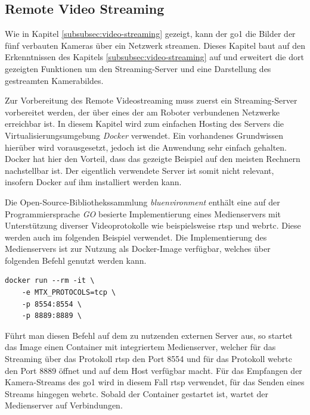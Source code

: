 \subsection{Remote Video Streaming}
\label{subsec:remote-video-streaming}

Wie in Kapitel \ref{subsubsec:video-streaming} gezeigt, kann der \gls{go1} die Bilder der fünf verbauten Kameras über
ein Netzwerk streamen.
Dieses Kapitel baut auf den Erkenntnissen des Kapitels \ref{subsubsec:video-streaming} auf und erweitert die dort gezeigten
Funktionen um den Streaming-Server und eine Darstellung des gestreamten Kamerabildes.


Zur Vorbereitung des Remote Videostreaming muss zuerst ein Streaming-Server vorbereitet werden, der über eines der am
Roboter verbundenen Netzwerke erreichbar ist.
In diesem Kapitel wird zum einfachen Hosting des Servers die Virtualisierungsumgebung \emph{Docker} verwendet.
Ein vorhandenes Grundwissen hierüber wird vorausgesetzt, jedoch ist die Anwendung sehr einfach gehalten.
Docker hat hier den Vorteil, dass das gezeigte Beispiel auf den meisten Rechnern nachstellbar ist.
Der eigentlich verwendete Server ist somit nicht relevant, insofern Docker auf ihm installiert werden kann.

Die Open-Source-Bibliothekssammlung \emph{bluenvironment} enthält eine auf der Programmiersprache \emph{GO} besierte
Implementierung eines Medienservers mit Unterstützung diverser Videoprotokolle wie beispielsweise \gls{rtsp} und
\gls{webrtc}.
Diese werden auch im folgenden Beispiel verwendet.
Die Implementierung des Medienservers ist zur Nutzung als Docker-Image verfügbar, welches über folgenden Befehl
genutzt werden kann.

\begin{lstlisting}
docker run --rm -it \
    -e MTX_PROTOCOLS=tcp \
    -p 8554:8554 \
    -p 8889:8889 \
\end{lstlisting}

Führt man diesen Befehl auf dem zu nutzenden externen Server aus, so startet das Image einen Container mit integriertem
Medienserver, welcher für das Streaming über das Protokoll \gls{rtsp} den Port \num{8554} und für das Protokoll \gls{webrtc}
den Port \num{8889} öffnet und auf dem Host verfügbar macht.
Für das Empfangen der Kamera-Streams des \gls{go1} wird in diesem Fall \gls{rtsp} verwendet, für das Senden eines Streams
hingegen \gls{webrtc}.
Sobald der Container gestartet ist, wartet der Medienserver auf Verbindungen.

